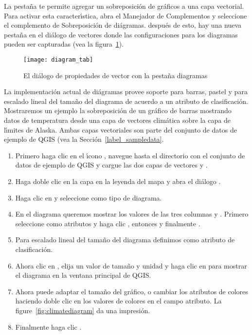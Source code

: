 La pesta\~na  te permite agregar un sobreposici\'on de gr\'aficos a una capa vectorial.
Para activar esta caracter\'{\i}stica, abra el Manejador de Complementos y seleccione el complemento  
de Sobreposici\'on de di\'agramas. después de esto, hay una nueva pesta\~na en el di\'alogo de vectores  donde las configuraciones para los diagramas pueden ser capturadas (vea 
la figura~\ref{fig:diagramtab}).

\begin{figure}[ht]
   \begin{center}
   \caption{El di\'alogo de propiedades de vector con la pesta\~na diagramas \nixcaption}\label{fig:diagramtab}\smallskip
   \texttt{[image: diagram\_tab]}
\end{center}
\end{figure}

La implementaci\'on actual de di\'agramas provee soporte para barras, pastel
y para escalado lineal del tama\~no del diagrama de acuerdo a un atributo de
clasificaci\'on. Mostraremos un ejemplo la sobreposici\'on de un gr\'afico de barras
mostrando datos de temperatura desde una capa de vectores clim\'atica sobre la capa de l\'{\i}mites de Alaska.
Ambas capas vectoriales son parte del conjunto de datos de ejemplo de QGIS (vea
la Secci\'on~\ref{label_sampledata}.

\begin{enumerate}
\item Primero haga clic en el \'{\i}cono ,
navegue hasta el directorio con el conjunto de datos de ejemplo de QGIS y cargue las dos capas de vectores
 y .
\item Haga doble clic en la capa  en la leyenda del mapa y abra el di\'alogo
.
\item Haga clic en  y seleccione  como
tipo de diagrama.
\item En el diagrama queremos mostrar los valores de las tres columnas
 y . Primero seleccione
 como atributos y haga clic , entonces
 y finalmente .  
\item Para escalado lineal del tama\~no del diagrama definimos 
como atributo de clasificaci\'on.
\item Ahora clic en , elija un valor de tama\~no y unidad y haga clic
en  para mostrar el diagrama en la ventana principal de QGIS.
\item Ahora puede adaptar el tama\~no del gr\'afico, o cambiar los atributos de colores haciendo
doble clic en los valores de colores en el campo atributo. La
figure~\ref{fig:climatediagram} da una impresi\'on.
\item Finalmente haga clic . 
\end{enumerate}

